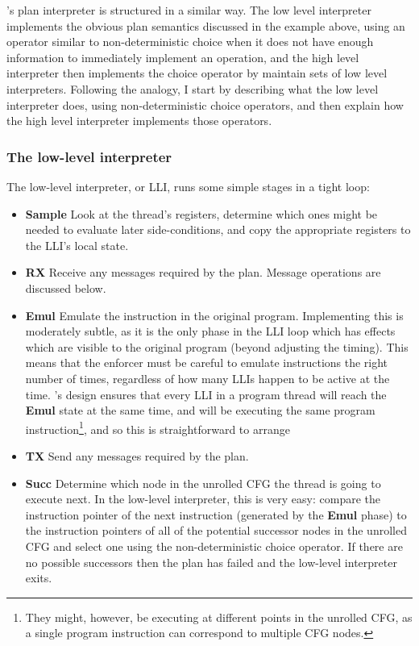 {\Implementation}'s plan interpreter is structured in a similar way.
The low level interpreter implements the obvious plan semantics
discussed in the example above, using an operator similar to
non-deterministic choice when it does not have enough information to
immediately implement an operation, and the high level interpreter
then implements the choice operator by maintain sets of low level
interpreters.  Following the analogy, I start by describing what the
low level interpreter does, using non-deterministic choice operators,
and then explain how the high level interpreter implements those
operators.

\subsubsection{The low-level interpreter}
\label{sect:enforce:llis}

The low-level interpreter, or LLI, runs some simple stages in a tight
loop:

\begin{itemize}
\item \textbf{Sample} Look at the thread's registers, determine which
  ones might be needed to evaluate later side-conditions, and copy the
  appropriate registers to the LLI's local state.

\item \textbf{RX} Receive any messages required by the plan.  Message
  operations are discussed below.

\item \textbf{Emul} Emulate the instruction in the original program.
  Implementing this is moderately subtle, as it is the only phase in
  the LLI loop which has effects which are visible to the original
  program (beyond adjusting the timing).  This means that the enforcer
  must be careful to emulate instructions the right number of times,
  regardless of how many LLIs happen to be active at the time.
  {\Technique}'s design ensures that every LLI in a program thread
  will reach the \textbf{Emul} state at the same time, and will be
  executing the same program instruction\footnote{They might, however,
    be executing at different points in the unrolled CFG, as a single
    program instruction can correspond to multiple CFG nodes.}, and so
  this is straightforward to arrange

\item \textbf{TX} Send any messages required by the plan.

\item \textbf{Succ} Determine which node in the unrolled CFG the
  thread is going to execute next.  In the low-level interpreter, this
  is very easy: compare the instruction pointer of the next
  instruction (generated by the \textbf{Emul} phase) to the
  instruction pointers of all of the potential successor nodes in the
  unrolled CFG and select one using the non-deterministic choice
  operator.  If there are no possible successors then the plan has
  failed and the low-level interpreter exits.
\end{itemize}

